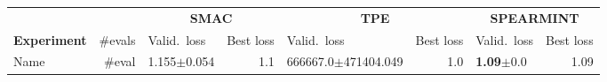 \documentclass[landscape]{article} %
\begin{document}
\begin{table}[t]
\begin{tabularx}{\textwidth}{lr|Xr|Xr|Xr}
\toprule
\multicolumn{2}{l}{}&\multicolumn{2}{c}{\bf SMAC}&\multicolumn{2}{c}{\bf TPE}&\multicolumn{2}{c}{\bf SPEARMINT}\\
\multicolumn{1}{l}{\bf Experiment} &\multicolumn{1}{r}{\#evals}&\multicolumn{1}{l}{Valid.\ loss} &\multicolumn{1}{r}{Best loss}&\multicolumn{1}{l}{Valid.\ loss} &\multicolumn{1}{r}{Best loss}&\multicolumn{1}{l}{Valid.\ loss} &\multicolumn{1}{r}{Best loss}\\
\toprule
Name & \#eval & 1.155$\pm$0.054 & 1.1 & 666667.0$\pm$471404.049 & 1.0 & \textbf{1.09}$\pm$0.0 & 1.09 \\
\bottomrule
\end{tabularx}
\end{table}
\end{document}
